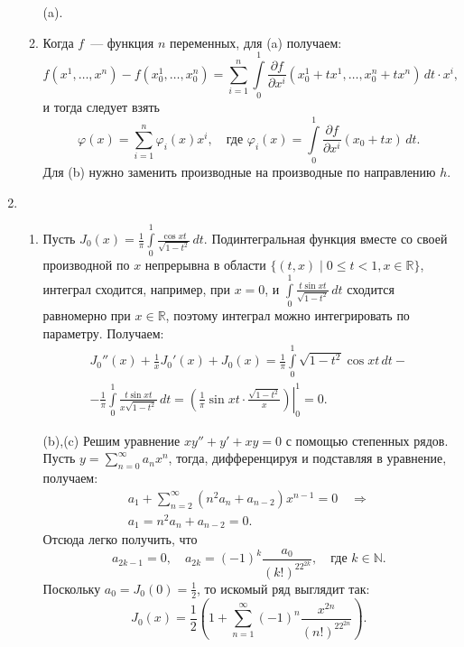 \documentclass[a4paper]{article}
\begin{document}
\begin{enumerate}
\begin{enumerate}
          (a).
          \item Когда $f$~--- функция $n$ переменных, для  (a)
          получаем:
          $$f(x^1,\ldots,x^n)-f(x_0^1,\ldots,x_0^n)=\sum\limits_{i=1}^n \int\limits_0^1
          \!\frac{\partial f}{\partial x^i}(x_0^1+tx^1,\ldots,x_0^n+tx^n)\,dt\cdot
          x^i,$$ и тогда следует взять
          $$\varphi(x)=\sum\limits_{i=1}^n\varphi_i(x)x^i,\quad \text{где $\varphi_i(x)=
          \int\limits_0^1\!\frac{\partial f}{\partial x^i}(x_0+tx)\,dt$}.$$
          Для (b) нужно заменить производные на производные по
          направлению $h$.
        \end{enumerate}
  \item \begin{enumerate}
          \item Пусть $J_0(x)=\frac{1}{\pi}\int\limits_0^1\!\frac{\cos
          xt}{\sqrt{1-t^2}}\,dt$. Подинтегральная функция вместе со
          своей производной по $x$ непрерывна в области $\{(t,x)\mid 0\leqslant t<1,
          x\in\mathbb{R}\}$, интеграл сходится, например, при $x=0$,
          и $\int\limits_0^1\!\frac{t\sin xt}{\sqrt{1-t^2}}\,dt$
          сходится равномерно при $x\in \mathbb{R}$, поэтому интеграл
          можно интегрировать по параметру. Получаем:
          \begin{align*}
          J_0''(x)+\frac{1}{x}J_0'(x)+J_0(x)=\frac{1}{\pi}\int\limits_0^1\!\sqrt{1-t^2}\cos
          xt\,dt - \\
          -\frac{1}{\pi}\int\limits_0^1\!\frac{t\sin xt}{x\sqrt{1-t^2}}\,dt=
          \left.\left(\frac{1}{\pi}\sin
          xt\cdot\frac{\sqrt{1-t^2}}{x}\right)\right|_0^1=0.
          \end{align*}
          \item [(b),(c)] Решим уравнение $xy''+y'+xy=0$ с помощью
          степенных рядов. Пусть $y=\sum\limits_{n=0}^\infty
          a_nx^n$, тогда, дифференцируя и подставляя в уравнение,
          получаем:
          \begin{gather*}
          a_1+\sum\limits_{n=2}^\infty(n^2a_n+a_{n-2})x^{n-1}=0\quad\Rightarrow\\
          a_1=n^2a_n+a_{n-2}=0.
          \end{gather*}
          Отсюда легко получить, что
          $$a_{2k-1}=0, \quad a_{2k}=(-1)^k\frac{a_0}{(k!)^22^{2k}}, \quad \text{где $k\in\mathbb{N}$}.$$
          Поскольку $a_0=J_0(0)=\frac{1}{2}$, то искомый ряд
          выглядит так:
          $$J_0(x)=\frac{1}{2}\left(1+\sum\limits_{n=1}^\infty(-1)^n\frac{x^{2n}}{(n!)^22^{2n}}\right).$$

\end{enumerate}
\end{enumerate}
\end{document}
